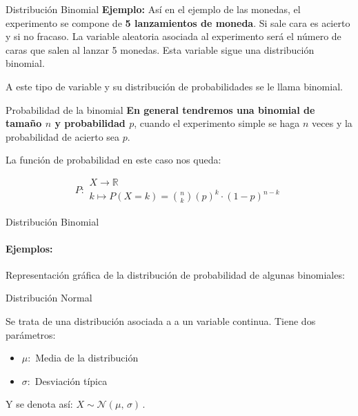 \documentclass[11pt,handout]{beamer}
\begin{document}
\begin{frame}{Distribución Binomial}
\textbf{Ejemplo:} Así en el ejemplo de las monedas, el experimento se compone de \textbf{5 lanzamientos de moneda}. Si sale cara es acierto y si no fracaso. La variable aleatoria asociada al experimento será el número de caras que salen al lanzar 5 monedas. Esta variable sigue una distribución binomial.


A este tipo de variable y su distribución de probabilidades se le llama binomial.
\end{frame}

\begin{frame}{Probabilidad de la binomial}
\textbf{En general tendremos una binomial de tamaño $n$ y probabilidad $p$}, cuando el experimento simple se haga $n$ veces y la probabilidad de acierto sea $p$.

La función de probabilidad en este caso nos queda:

\begin{block}
 $$P\colon \begin{array}{l} 
          X \rightarrow \mathbb{R} \\ 
          k\mapsto P(X=k)=\binom{n}{k}\left(p\right)^k\cdot  \left(1-p\right)^{n-k} 
         \end{array}$$

\end{block} 
    
\end{frame}

\begin{frame}{Distribución Binomial}
         
\paragraph{Ejemplos:} Representación gráfica de la distribución de probabilidad de algunas binomiales:    
         

    
\end{frame}



\begin{frame}
{Distribución Normal}

Se trata de una distribución asociada a a un variable continua. Tiene dos parámetros:
\begin{itemize} [<+->]
    \item $\mu :$ Media de la distribución
    \item $\sigma :$ Desviación típica
\end{itemize}
Y se denota así: $
X \sim \mathcal{N}(\mu,\,\sigma)\,.
    $ 
\end{frame}
\end{document}
